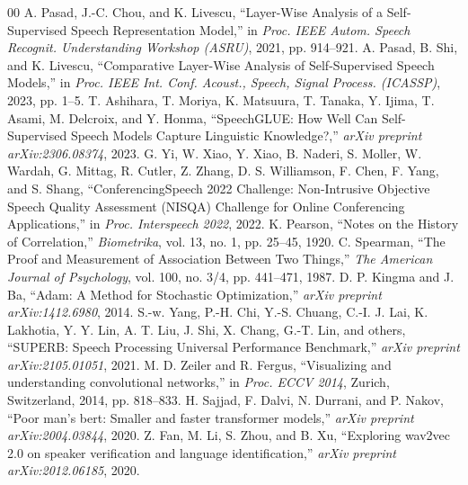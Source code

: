 \documentclass[conference]{IEEEtran}
\begin{document}
\begin{thebibliography}{00}
 A. Pasad, J.-C. Chou, and K. Livescu, ``Layer-Wise Analysis of a Self-Supervised Speech Representation Model,'' in \textit{Proc. IEEE Autom. Speech Recognit. Understanding Workshop (ASRU)}, 2021, pp. 914--921.
 A. Pasad, B. Shi, and K. Livescu, ``Comparative Layer-Wise Analysis of Self-Supervised Speech Models,'' in \textit{Proc. IEEE Int. Conf. Acoust., Speech, Signal Process. (ICASSP)}, 2023, pp. 1--5.
 T. Ashihara, T. Moriya, K. Matsuura, T. Tanaka, Y. Ijima, T. Asami, M. Delcroix, and Y. Honma, ``SpeechGLUE: How Well Can Self-Supervised Speech Models Capture Linguistic Knowledge?,'' \textit{arXiv preprint arXiv:2306.08374}, 2023.
 G. Yi, W. Xiao, Y. Xiao, B. Naderi, S. Moller, W. Wardah, G. Mittag, R. Cutler, Z. Zhang, D. S. Williamson, F. Chen, F. Yang, and S. Shang, ``ConferencingSpeech 2022 Challenge: Non-Intrusive Objective Speech Quality Assessment (NISQA) Challenge for Online Conferencing Applications,'' in \textit{Proc. Interspeech 2022}, 2022.
 K. Pearson, ``Notes on the History of Correlation,'' \textit{Biometrika}, vol. 13, no. 1, pp. 25--45, 1920.
 C. Spearman, ``The Proof and Measurement of Association Between Two Things,'' \textit{The American Journal of Psychology}, vol. 100, no. 3/4, pp. 441--471, 1987.
 D. P. Kingma and J. Ba, ``Adam: A Method for Stochastic Optimization,'' \textit{arXiv preprint arXiv:1412.6980}, 2014.
 S.-w. Yang, P.-H. Chi, Y.-S. Chuang, C.-I. J. Lai, K. Lakhotia, Y. Y. Lin, A. T. Liu, J. Shi, X. Chang, G.-T. Lin, and others, ``SUPERB: Speech Processing Universal Performance Benchmark,'' \textit{arXiv preprint arXiv:2105.01051}, 2021.
 M. D. Zeiler and R. Fergus, ``Visualizing and understanding convolutional networks,'' in \textit{Proc. ECCV 2014}, Zurich, Switzerland, 2014, pp. 818--833.
 H. Sajjad, F. Dalvi, N. Durrani, and P. Nakov, ``Poor man’s bert: Smaller and faster transformer models,'' \textit{arXiv preprint arXiv:2004.03844}, 2020.
 Z. Fan, M. Li, S. Zhou, and B. Xu, ``Exploring wav2vec 2.0 on speaker verification and language identification,'' \textit{arXiv preprint arXiv:2012.06185}, 2020.



\end{thebibliography}
\end{document}

